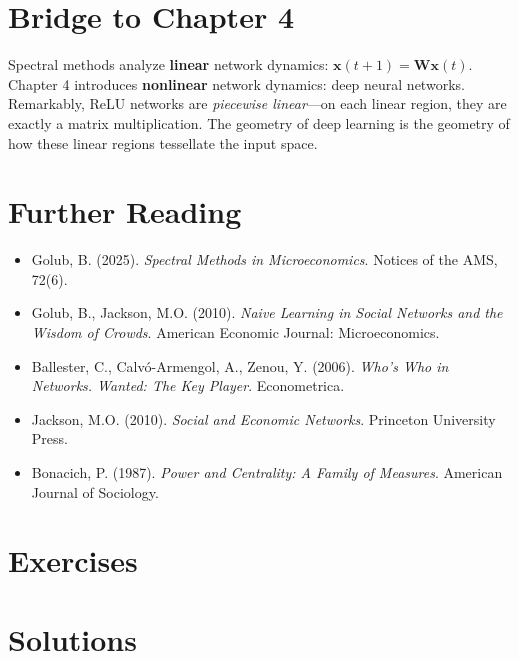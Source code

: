 \section{Bridge to Chapter 4}
\label{sec:spec:bridge}

Spectral methods analyze \textbf{linear} network dynamics: $\bm{x}(t+1) = \bm{W}\bm{x}(t)$. Chapter 4 introduces \textbf{nonlinear} network dynamics: deep neural networks. Remarkably, ReLU networks are \emph{piecewise linear}---on each linear region, they are exactly a matrix multiplication. The geometry of deep learning is the geometry of how these linear regions tessellate the input space.

\section{Further Reading}
\label{sec:spec:refs}

\begin{itemize}
    \item Golub, B. (2025). \textit{Spectral Methods in Microeconomics}. Notices of the AMS, 72(6).
    \item Golub, B., Jackson, M.O. (2010). \textit{Naive Learning in Social Networks and the Wisdom of Crowds}. American Economic Journal: Microeconomics.
    \item Ballester, C., Calvó-Armengol, A., Zenou, Y. (2006). \textit{Who's Who in Networks. Wanted: The Key Player}. Econometrica.
    \item Jackson, M.O. (2010). \textit{Social and Economic Networks}. Princeton University Press.
    \item Bonacich, P. (1987). \textit{Power and Centrality: A Family of Measures}. American Journal of Sociology.
\end{itemize}

\section{Exercises}
\section{Solutions}
\label{sec:spec:solutions}

